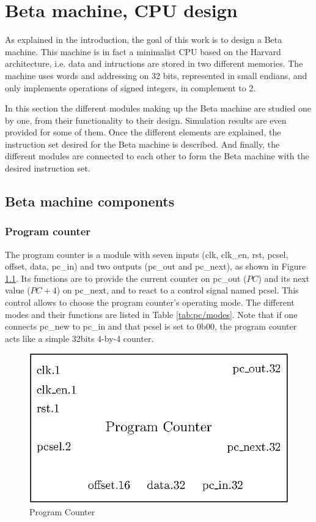 \chapter{Beta machine, CPU design}

As explained in the introduction, the goal of this work is to design a Beta machine. This machine is 
in fact a minimalist CPU based on the Harvard architecture, i.e. data and intructions are stored in 
two different memories. The machine uses words and addressing on 32 bits, represented in small endians, 
and only implements operations of signed integers, in complement to 2. 

In this section the different modules making up the Beta machine are studied one by one, from 
their functionality to their design. Simulation results are even provided for some of them. Once the 
different elements are explained, the instruction set desired for the Beta machine is
described. And finally, the different modules are connected to each other to form the Beta
machine with the desired instruction set.

\section{Beta machine components}

\subsection{Program counter}

The program counter is a module with seven inputs (clk, clk\_en, rst, pcsel, offset, data, pc\_in) 
and two outputs (pc\_out and pc\_next), as shown in Figure \ref{fig:components/pc}. 
Its functions are to provide the current counter on pc\_out ($PC$) and its 
next value ($PC + 4$) on pc\_next, and to react to a control signal named pcsel. This control 
allows to choose the program counter's operating mode. The different modes and their functions
are listed in Table \ref{tab:pc/modes}. Note that if one connects pc\_new to pc\_in and that pcsel
is set to 0b00, the program counter acts like a simple 32bits 4-by-4 counter.

\begin{figure}[H]
    \centering
    \includegraphics[scale=0.8]{Chapter3-CPU/res/pc}
    \caption{Program Counter}
    \label{fig:components/pc}
\end{figure}

